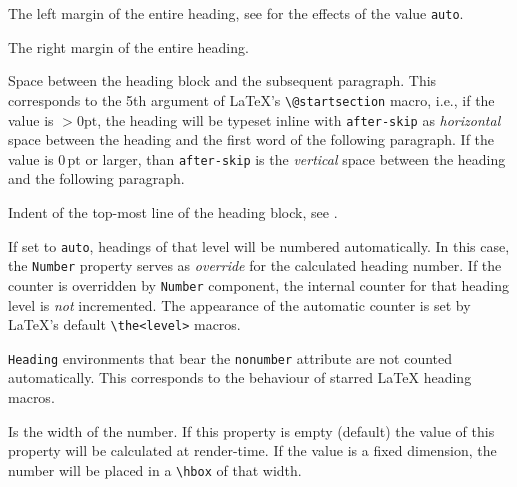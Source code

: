
The left margin of the entire heading, see 
for the effects of the value \lstinline{auto}.


The right margin of the entire heading.


Space between the heading block and the subsequent paragraph. This
corresponds to the 5th argument of \LaTeX's \lstinline{\@startsection}
macro, i.e., if the value is ${}> 0\mathrm{pt}$, the heading will be typeset inline
with \lstinline{after-skip} as \textit{horizontal} space between the
heading and the first word of the following paragraph. If the value is
$0\,\mathrm{pt}$ or larger, than \lstinline{after-skip} is the
\textit{vertical} space between the heading and the following
paragraph.


Indent of the top-most line of the heading block, see .

%

If set to \lstinline{auto}, headings of that level will be numbered
automatically. In this case, the \texttt{Number} property serves as
\textit{override} for the calculated heading number. If the counter is
overridden by \lstinline{Number} component, the internal counter for
that heading level is \textit{not} incremented. The appearance of the
automatic counter is set by \LaTeX's default \lstinline{\the<level>}
macros.

\lstinline{Heading} environments that bear the \lstinline{nonumber}
attribute are not counted automatically. This corresponds to the
behaviour of starred {\LaTeX} heading macros.


Is the width of the number. If this property is empty (default) the
value of this property will be calculated at render-time. If the value
is a fixed dimension, the number will be placed in a \lstinline{\hbox}
of that width.


